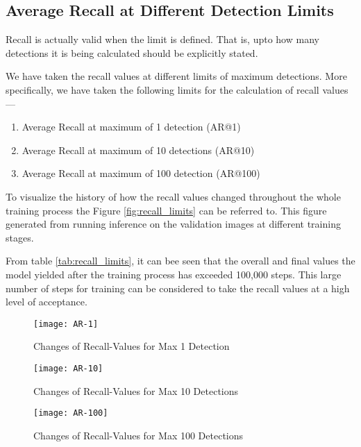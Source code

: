         \subsection{Average Recall at Different Detection Limits}
            Recall is actually valid when the limit is defined. That is, upto how many detections it is being calculated should be explicitly stated.
            
            \vspace{1cm}
            We have taken the recall values at different limits of maximum detections. More specifically, we have taken the following limits for the calculation of recall values---
            \begin{enumerate}
                \item {Average Recall at maximum of 1 detection (AR@1)}
                \item {Average Recall at maximum of 10 detections (AR@10)}
                \item {Average Recall at maximum of 100 detection (AR@100)}
            \end{enumerate}
            
            \vspace{1cm}
            To visualize the history of how the recall values changed throughout the whole training process the Figure \ref{fig:recall_limits} can be referred to. This figure generated from running inference on the validation images at different training stages.
            
            \vspace{1cm}
            From table \ref{tab:recall_limits}, it can bee seen that the overall and final values the model yielded after the training process has exceeded 100,000 steps. This large number of steps for training can be considered to take the recall values at a high level of acceptance.
            
            \clearpage
            \begin{figure}
                \centering
                \texttt{[image: AR-1]}
                \caption{Changes of Recall-Values for Max 1 Detection}
                \label{fig:recall_limits_1}
            \end{figure}
            \begin{figure}
                \centering
                \texttt{[image: AR-10]}
                \caption{Changes of Recall-Values for Max 10 Detections}
                \label{fig:recall_limits_10}
            \end{figure}
            \begin{figure}
                \centering
                \texttt{[image: AR-100]}
                \caption{Changes of Recall-Values for Max 100 Detections}
                \label{fig:recall_limits_100}
            \end{figure}
            
